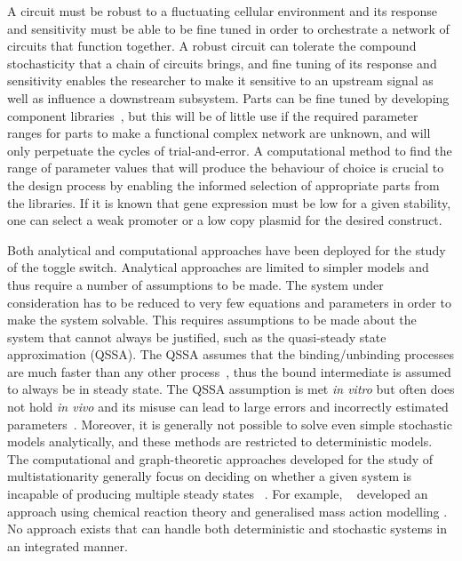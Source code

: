 A circuit must be robust to a fluctuating cellular environment and its response and sensitivity must be able to be fine tuned in order to orchestrate a network of circuits that function together. A robust circuit can tolerate the compound stochasticity that a chain of circuits brings, and fine tuning of its response and sensitivity enables the researcher to make it sensitive to an upstream signal as well as influence a downstream subsystem. Parts can be fine tuned by developing component libraries~\autocite{Lu:2009ez,}, but this will be of little use if the required parameter ranges for parts to make a functional complex network are unknown, and will only perpetuate the cycles of trial-and-error. A computational method to find the range of parameter values that will produce the behaviour of choice is crucial to the design process by enabling the informed selection of appropriate parts from the libraries. If it is known that gene expression must be low for a given stability, one can select a weak promoter or a low copy plasmid for the desired construct. 

Both analytical and computational approaches have been deployed for the study of the toggle switch. Analytical approaches are limited to simpler models and thus require a number of assumptions to be made. The system under consideration has to be reduced to very few equations and parameters in order to make the system solvable. This requires assumptions to be made about the system that cannot always be justified, such as the quasi-steady state approximation (QSSA). The QSSA assumes that the binding/unbinding processes are much faster than any other process~\autocite{Loinger:2007vma}, thus the bound intermediate is assumed to always be in steady state. The QSSA assumption is met \textit{in vitro} but often does not hold \textit{in vivo} and its misuse can lead to large errors and incorrectly estimated parameters~\autocite{Pedersen:2007ke}. Moreover, it is generally not possible to solve even simple stochastic models analytically, and these methods are restricted to deterministic models. The computational and graph-theoretic approaches developed for the study of multistationarity generally focus on deciding on whether a given system is incapable of producing multiple steady states ~\autocite{Conradi:2007jo, Banaji:2010fh,Feliu:2013dz}. For example, ~\textcite{Feliu:2013dz} developed an approach using chemical reaction theory and generalised mass action modelling \autocite{Feliu:2013dz}. No approach exists that can handle both deterministic and stochastic systems in an integrated manner.

